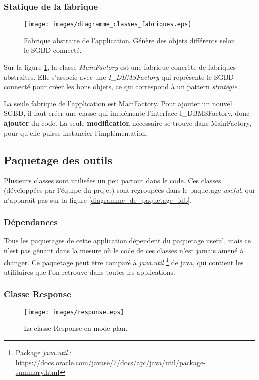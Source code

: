 \subsubsection{Statique de la fabrique}
\begin{figure}[!h]
  \centering
  \texttt{[image: images/diagramme\_classes\_fabriques.eps]}
  \caption{Fabrique abstraite de l'application. Génère des objets différents selon le SGBD connecté.}
  \label{diagramme_classes_fabrique}
\end{figure}

Sur la figure \ref{diagramme_classes_fabrique}, la classe \textit{MainFactory} est une fabrique concrète de fabriques abstraites.
Elle s'associe avec une \textit{I\_DBMSFactory} qui représente le SGBD connecté pour créer les bons objets, ce qui correspond à un pattern \textit{stratégie}.

La seule fabrique de l'application est MainFactory.
Pour ajouter un nouvel SGBD, il faut créer une classe qui implémente l'interface I\_DBMSFactory, donc \textbf{ajouter} du code.
La seule \textbf{modification} nécessaire se trouve dans MainFactory, pour qu'elle puisse instancier l'implémentation.

\subsection{Paquetage des outils}
Plusieurs classes sont utilisées un peu partout dans le code.
Ces classes (développées par l'équipe du projet) sont regroupées dans le paquetage \textit{useful}, qui n'apparaît pas sur la figure \ref{diagramme_de_paquetage_idb}.

\subsubsection{Dépendances}
Tous les paquetages de cette application dépendent du paquetage useful, mais ce n'est pas gênant dans la mesure où le code de ces classes n'est jamais amené à changer.
Ce paquetage peut être comparé à \textit{java.util}
\footnote{\label{paguetage_java_util}Package \textit{java.util} : \url{https://docs.oracle.com/javase/7/docs/api/java/util/package-summary.html}}
de java, qui contient les utilitaires que l'on retrouve dans toutes les applications.

\subsubsection{Classe Response}
\begin{figure}[!h]
  \centering
  \texttt{[image: images/response.eps]}
  \caption{La classe Response en mode plan.}
  \label{uml_classe_response}
\end{figure}

